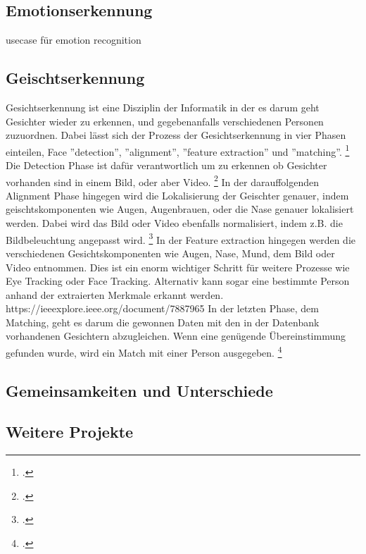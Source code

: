 \documentclass[12pt, a4paper]{scrbook}
\begin{document}
\subsection{Emotionserkennung}

usecase für emotion recognition

\subsection{Geischtserkennung}
Gesichtserkennung ist eine Disziplin der Informatik in der es darum geht Gesichter wieder zu erkennen, und gegebenanfalls verschiedenen Personen zuzuordnen. Dabei lässt sich der Prozess der Gesichtserkennung in vier Phasen einteilen, Face ''detection'', ''alignment'', ''feature extraction'' und ''matching''.
\footcite[Vgl. ][2]{HandbookFaceRec}
Die Detection Phase ist dafür verantwortlich um zu erkennen ob Gesichter vorhanden sind in einem Bild, oder aber Video.
\footcite[Vgl. ][2]{HandbookFaceRec}
 In der darauffolgenden Alignment Phase hingegen wird die Lokalisierung der Geischter genauer, indem geischtskomponenten wie Augen, Augenbrauen, oder die Nase genauer lokalisiert werden. Dabei wird das Bild oder Video ebenfalls  normalisiert, indem z.B. die Bildbeleuchtung angepasst wird.
 \footcite[Vgl. ][2]{HandbookFaceRec}
 In der Feature extraction hingegen werden die verschiedenen Gesichtskomponenten wie Augen, Nase, Mund, dem Bild oder Video entnommen. Dies ist ein enorm wichtiger Schritt für weitere Prozesse wie Eye Tracking oder Face Tracking. Alternativ kann sogar eine bestimmte Person anhand der extraierten Merkmale erkannt werden.
 https://ieeexplore.ieee.org/document/7887965
 In der letzten Phase, dem Matching, geht es darum die gewonnen Daten mit den in der Datenbank vorhandenen Gesichtern abzugleichen. Wenn eine genügende Übereinstimmung gefunden wurde, wird ein Match mit einer Person ausgegeben.
  \footcite[Vgl. ][3]{HandbookFaceRec}
 
 
\subsection{Gemeinsamkeiten und Unterschiede}
\subsection{Weitere Projekte}
\end{document}
